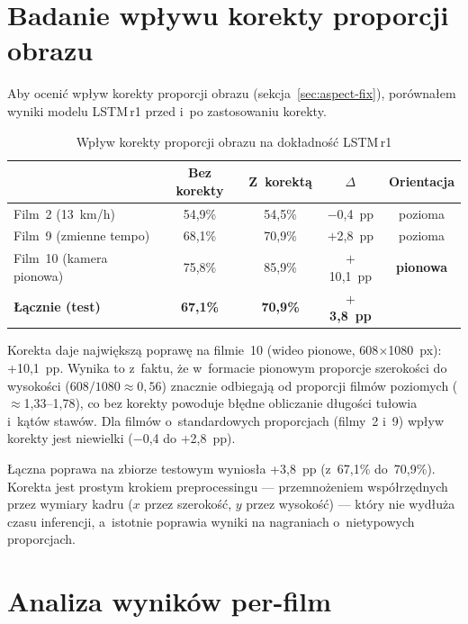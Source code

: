 \section{Badanie wpływu korekty proporcji obrazu}
\label{sec:ablation-aspect}

Aby ocenić wpływ korekty proporcji obrazu (sekcja~\ref{sec:aspect-fix}), porównałem wyniki modelu LSTM\,r1 przed i~po zastosowaniu korekty. 

\begin{table}[htbp]
\centering
\caption{Wpływ korekty proporcji obrazu na dokładność LSTM\,r1}
\label{tab:aspect-fix-results}
\small
\begin{tabular}{lcccc}
\hline
 & \textbf{Bez korekty} & \textbf{Z~korektą} & \textbf{$\Delta$} & \textbf{Orientacja} \\
\hline
Film~2 (13~km/h)      & 54{,}9\% & 54{,}5\% & $-$0{,}4~pp & pozioma \\
Film~9 (zmienne tempo) & 68{,}1\% & 70{,}9\% & $+$2{,}8~pp & pozioma \\
Film~10 (kamera pionowa) & 75{,}8\% & 85{,}9\% & $+$10{,}1~pp & \textbf{pionowa} \\
\hline
\textbf{Łącznie (test)} & \textbf{67{,}1\%} & \textbf{70{,}9\%} & $+$\textbf{3{,}8~pp} & \\
\hline
\end{tabular}
\end{table}

Korekta daje największą poprawę na filmie~10 (wideo pionowe, 608$\times$1080~px): +10{,}1~pp. Wynika to z~faktu, że w~formacie pionowym proporcje szerokości do wysokości ($608/1080 \approx 0{,}56$) znacznie odbiegają od proporcji filmów poziomych ($\approx$1{,}33--1{,}78), co bez korekty powoduje błędne obliczanie długości tułowia i~kątów stawów. Dla filmów o~standardowych proporcjach (filmy~2 i~9) wpływ korekty jest niewielki ($-$0{,}4 do $+$2{,}8~pp).

Łączna poprawa na zbiorze testowym wyniosła +3{,}8~pp (z~67{,}1\% do~70{,}9\%). Korekta jest prostym krokiem preprocessingu --- przemnożeniem współrzędnych przez wymiary kadru ($x$ przez szerokość, $y$ przez wysokość) --- który nie wydłuża czasu inferencji, a~istotnie poprawia wyniki na nagraniach o~nietypowych proporcjach.

\section{Analiza wyników per-film}
\label{sec:per-film}

